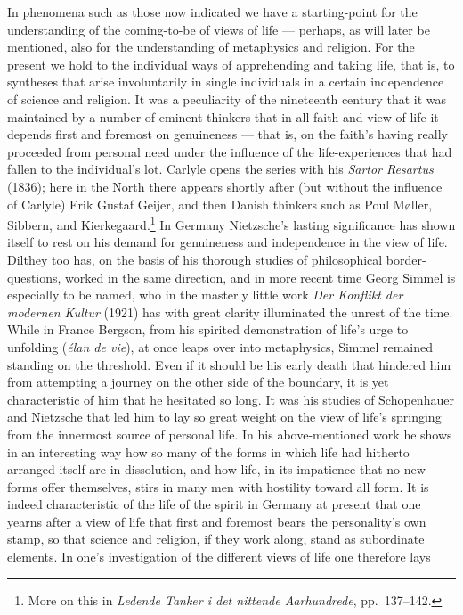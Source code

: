 \documentclass[12pt]{book}
\newcommand{\opage}[1]{\marginnote{\footnotesize\textit{[#1]}}}
\begin{document}
In phenomena such as those now indicated we have a starting-point for the understanding of the
coming-to-be of views of life --- perhaps, as will later be mentioned, also for the understanding of
metaphysics and religion. For the present we hold to the individual ways of apprehending and taking
life, that is, to syntheses that arise involuntarily in single individuals in a certain independence of
science and religion. It was a peculiarity of the nineteenth century that it was maintained by a number
of eminent thinkers that in all faith and view of life it depends first and foremost on genuineness ---
that is, on the faith's having really proceeded from personal need under the influence of the
life-experiences that had fallen to the individual's lot. Carlyle opens the series with his \textit{Sartor
Resartus} (1836); here in the North there appears shortly after (but without the influence of Carlyle)
Erik Gustaf Geijer, and then Danish thinkers such as Poul Møller, Sibbern, and Kierkegaard.\footnote{More
on this in \textit{Ledende Tanker i det nittende Aarhundrede}, pp.\ 137--142.} In Germany Nietzsche's
lasting significance has shown itself to rest on his demand for genuineness and independence in the view
of life. Dilthey too has, on the basis of his thorough studies of philosophical border-questions, worked
in the same direction, and in more recent time Georg Simmel is especially to be named, who in the
masterly little work \textit{Der Konflikt der modernen Kultur} (1921) has with great clarity illuminated
the unrest of the time. While in \opage{50}France Bergson, from his spirited demonstration of life's urge to
unfolding (\textit{élan de vie}), at once leaps over into metaphysics, Simmel remained standing on the
threshold. Even if it should be his early death that hindered him from attempting a journey on the other
side of the boundary, it is yet characteristic of him that he hesitated so long. It was his studies of
Schopenhauer and Nietzsche that led him to lay so great weight on the view of life's springing from the
innermost source of personal life. In his above-mentioned work he shows in an interesting way how so
many of the forms in which life had hitherto arranged itself are in dissolution, and how life, in its
impatience that no new forms offer themselves, stirs in many men with hostility toward all form. It is
indeed characteristic of the life of the spirit in Germany at present that one yearns after a view of life that
first and foremost bears the personality's own stamp, so that science and religion, if they work along,
stand as subordinate elements. In one's investigation of the different views of life one therefore lays
\end{document}
